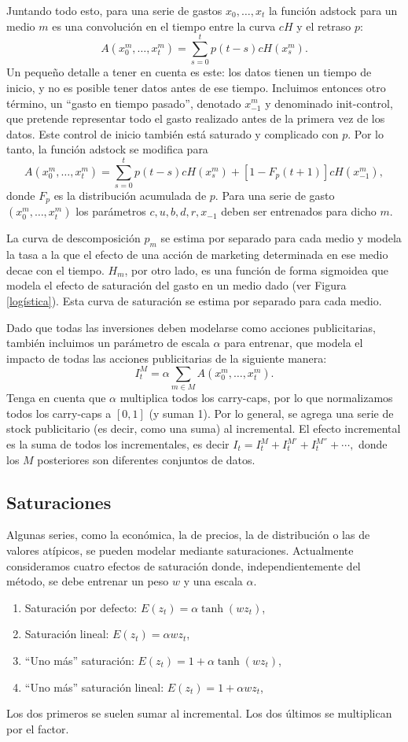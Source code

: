 Juntando todo esto, para una serie de gastos \(x_0, \dotsc, x_t\) la función adstock para un medio \(m\) es una convolución en el tiempo entre la curva \(cH\) y el retraso \(p \):
\[ A(x_0^m, \dotsc, x_t^m) = \sum_{s=0}^t p(t-s) c H(x_s^m). \]
Un pequeño detalle a tener en cuenta es este: los datos tienen un tiempo de inicio, y no es posible tener datos antes de ese tiempo. Incluimos entonces otro término, un ``gasto en tiempo pasado'', denotado \(x_{-1}^m\) y denominado init-control, que pretende representar todo el gasto realizado antes de la primera vez de los datos. Este control de inicio también está saturado y complicado con \(p\). Por lo tanto, la función adstock se modifica para
\[ A(x_0^m, \dotsc, x_t^m) = \sum_{s=0}^t p(t-s) cH(x_s^m) + [1 - F_p(t+1)] cH(x_{- 1}^m), \]
donde \(F_p\) es la distribución acumulada de \(p\). Para una serie de gasto \((x_0^m, \dotsc, x_t^m)\) los parámetros \(c, u, b, d, r, x_{-1}\) deben ser entrenados para dicho \(m\).

La curva de descomposición $p_m$ se estima por separado para cada medio y modela la tasa a la que el efecto de una acción de marketing determinada en ese medio decae con el tiempo. $H_m$, por otro lado, es una función de forma sigmoidea que modela el efecto de saturación del gasto en un medio dado (ver Figura \ref{logística}). Esta curva de saturación se estima por separado para cada medio.

Dado que todas las inversiones deben modelarse como acciones publicitarias, también incluimos un parámetro de escala \(\alpha\) para entrenar, que modela el impacto de todas las acciones publicitarias de la siguiente manera:
\[ I_t^M = \alpha \sum_{m \in M} A(x_0^m, \dotsc, x_t^m). \]
Tenga en cuenta que \(\alpha\) multiplica todos los carry-caps, por lo que normalizamos todos los carry-caps a \([0,1]\) (y suman 1). Por lo general, se agrega una serie de stock publicitario (es decir, como una suma) al incremental. El efecto incremental es la suma de todos los incrementales, es decir \( I_t = I_t^M + I_t^{M'} + I_t^{M''} + \dotsb, \) donde los \(M\) posteriores son diferentes conjuntos de datos.


\subsection{Saturaciones}

Algunas series, como la económica, la de precios, la de distribución o las de valores atípicos, se pueden modelar mediante saturaciones. Actualmente consideramos cuatro efectos de saturación donde, independientemente del método, se debe entrenar un peso \(w\) y una escala \(\alpha\).
\begin{enumerate}
	\item Saturación por defecto: \(E(z_t) = \alpha \tanh(w z_t)\),
	\item Saturación lineal: \(E(z_t) = \alpha w z_t\),
	\item ``Uno más'' saturación: \(E(z_t) = 1 + \alpha \tanh(w z_t)\),
	\item ``Uno más'' saturación lineal: \(E(z_t) = 1 + \alpha w z_t\),
\end{enumerate}
Los dos primeros se suelen sumar al incremental. Los dos últimos se multiplican por el factor.

